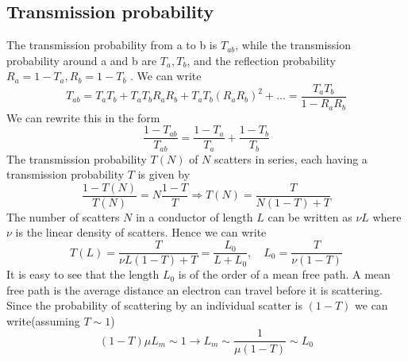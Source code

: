 \documentclass[11pt,a4paper]{book}
\theoremstyle{plain}
\theoremstyle{definition}
\theoremstyle{remark}
\begin{document}
\subsection{Transmission probability}
The transmission probability from a to b is $T_{ab}$, while the transmission probability around a and b are $T_a, T_b$, and the reflection probability $R_a = 1-T_a, R_b = 1-T_b$ . We can write
\begin{equation}
    T_{ab} = T_a T_b + T_a T_b R_a R_b + T_a T_b (R_a R_b)^2 +... = \frac{T_a T_b}{1 - R_a R_b}
\end{equation}
We can rewrite this in the form
\begin{equation}
    \frac{1-T_{ab}}{T_{ab}} = \frac{1-T_a}{T_a} + \frac{1-T_b}{T_b}
\end{equation}
The transmission probability $T(N)$ of $N$ scatters in series, each having a transmission probability $T$ is given by
\begin{equation}
    \frac{1-T(N)}{T(N)} = N \frac{1-T}{T} \Rightarrow T(N) = \frac{T}{N(1-T) + T}
\end{equation}
The number of scatters $N$ in a conductor of length $L$ can be written as $\nu L$ where $\nu$ is the linear density of scatters. Hence we can write
\begin{equation}
    T(L) = \frac{T}{\nu L (1-T) + T} = \frac{L_0}{L + L_0}, \quad L_0 = \frac{T}{\nu (1-T)}
\end{equation}
It is easy to see that the length $L_0$ is of the order of a mean free path. A mean free path is the average distance an electron can travel before it is scattering. Since the probability of scattering by an individual scatter is $(1-T)$ we can write(assuming $T \sim 1$)
\begin{equation}
    (1-T)\mu L_m \sim 1 \rightarrow L_m \sim \frac{1}{\mu (1-T)} \sim L_0
\end{equation}
\end{document}
